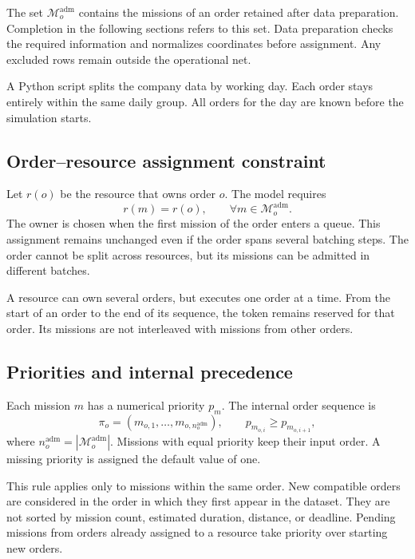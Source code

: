 The set $\mathcal M_o^{\mathrm{adm}}$ contains the missions of an order retained
after data preparation. Completion in the following sections refers to this
set. Data preparation checks the required information and normalizes coordinates
before assignment. Any excluded rows remain outside the operational net.

\begin{nota}
    A Python script splits the company data by working day. Each order stays
    entirely within the same daily group. All orders for the day are known
    before the simulation starts.
\end{nota}

\subsection{Order--resource assignment constraint}

Let $r(o)$ be the resource that owns order $o$. The model requires
\begin{equation}
    r(m)=r(o),\qquad \forall m\in\mathcal M_o^{\mathrm{adm}}.
\end{equation}
The owner is chosen when the first mission of the order enters a queue.
This assignment remains unchanged even if the order spans several batching
steps. The order cannot be split across resources, but its missions can be
admitted in different batches.

A resource can own several orders, but executes one order at a time. From the
start of an order to the end of its sequence, the token remains reserved for
that order. Its missions are not interleaved with missions from other orders.

\subsection{Priorities and internal precedence}

Each mission $m$ has a numerical priority $p_m$. The internal order sequence is
\begin{equation}
    \pi_o=(m_{o,1},\ldots,m_{o,n_o^{\mathrm{adm}}}),\qquad
    p_{m_{o,i}}\geq p_{m_{o,i+1}},
\end{equation}
where $n_o^{\mathrm{adm}}=|\mathcal M_o^{\mathrm{adm}}|$.
Missions with equal priority keep their input order. A missing priority is
assigned the default value of one.

This rule applies only to missions within the same order. New compatible
orders are considered in the order in which they first appear in the dataset.
They are not sorted by mission count, estimated duration, distance, or deadline.
Pending missions from orders already assigned to a resource take priority over
starting new orders.

